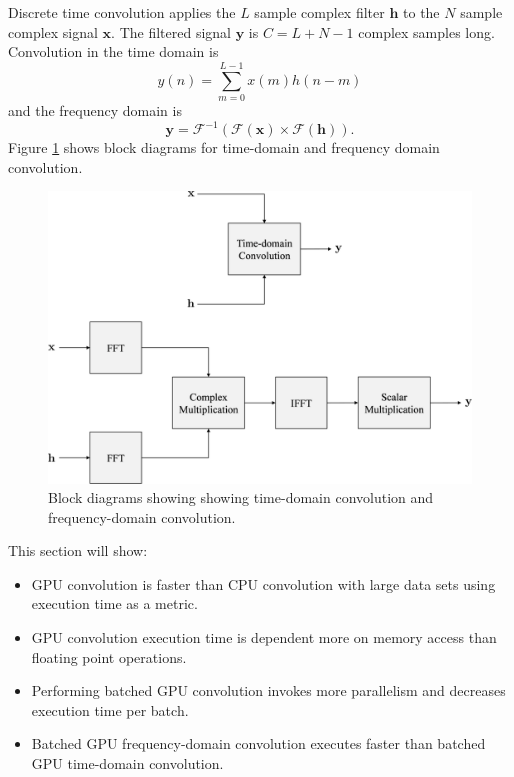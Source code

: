 Discrete time convolution applies the $L$ sample complex filter $\mathbf{h}$ to the $N$ sample complex signal $\mathbf{x}$.
The filtered signal $\mathbf{y}$ is $C = L + N - 1$ complex samples long.
Convolution in the time domain is
\begin{equation}
y(n) = \sum^{L-1}_{m=0} x(m) h(n-m)
  \label{eq:simple_conv_time}
\end{equation}
and the frequency domain is
\begin{equation}
\mathbf{y} = \mathscr{F}^{-1}(\mathscr{F}(\mathbf{x})\times\mathscr{F}(\mathbf{h})).
  \label{eq:simple_conv_freq}
\end{equation}
Figure \ref{fig:freq_time_block} shows block diagrams for time-domain and frequency domain convolution.
\begin{figure}
	\centering\includegraphics[width=10.28in/100*55]{figures/gpu_convolution/convBlock.pdf}
	\caption{Block diagrams showing showing time-domain convolution and frequency-domain convolution.}
	\label{fig:freq_time_block}
\end{figure}
This section will show:
\begin{itemize}
\item GPU convolution is faster than CPU convolution with large data sets using execution time as a metric.
\item GPU convolution execution time is dependent more on memory access than floating point operations.
\item Performing batched GPU convolution invokes more parallelism and decreases execution time per batch.
\item Batched GPU frequency-domain convolution executes faster than batched GPU time-domain convolution.
\end{itemize}

